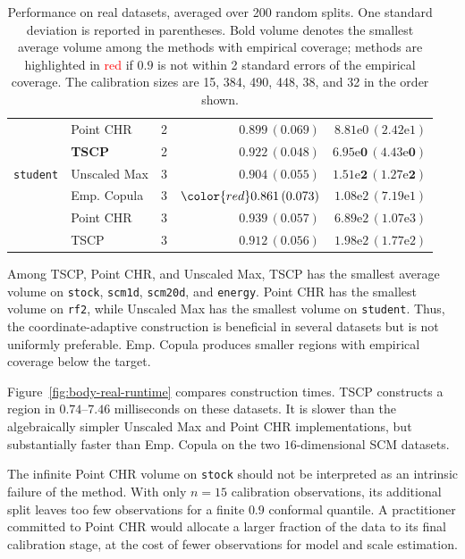 \begin{table}[!htbp]
\begin{tabular}{llrrr}
 & Point CHR & 2 & $0.899\,(0.069)$ & $8.81\mathrm{e}{0}\,(2.42\mathrm{e}{1})$ \\
 & \textbf{TSCP} & 2 & $0.922\,(0.048)$ & $\mathbf{6.95\mathrm{e}{0}\,(4.43\mathrm{e}{0})}$ \\
\addlinespace
\texttt{student} & Unscaled Max & 3 & $0.904\,(0.055)$ & $\mathbf{1.51\mathrm{e}{2}\,(1.27\mathrm{e}{2})}$ \\
 & Emp. Copula & 3 & ${\color{red}0.861\,(0.073)}$ & $1.08\mathrm{e}{2}\,(7.19\mathrm{e}{1})$ \\
 & Point CHR & 3 & $0.939\,(0.057)$ & $6.89\mathrm{e}{2}\,(1.07\mathrm{e}{3})$ \\
 & TSCP & 3 & $0.912\,(0.056)$ & $1.98\mathrm{e}{2}\,(1.77\mathrm{e}{2})$ \\
\bottomrule
\end{tabular}
\caption{Performance on real datasets, averaged over 200 random splits. One
standard deviation is reported in parentheses. Bold volume denotes the
smallest average volume among the methods with empirical coverage; methods are highlighted in \textcolor{red}{red} if $0.9$ is not within 2 standard errors of the empirical coverage. The calibration sizes are 15, 384,
490, 448, 38, and 32 in the order shown.}
\label{tab:real-data}
\end{table}

Among TSCP, Point CHR, and Unscaled Max, TSCP has the smallest average
volume on \texttt{stock}, \texttt{scm1d}, \texttt{scm20d}, and
\texttt{energy}. Point CHR has the smallest volume on \texttt{rf2}, while
Unscaled Max has the smallest volume on \texttt{student}. Thus, the
coordinate-adaptive construction is beneficial in several datasets but is
not uniformly preferable. Emp. Copula produces smaller regions with
empirical coverage below the target.

Figure~\ref{fig:body-real-runtime} compares construction times.
TSCP constructs a region in $0.74$--$7.46$ milliseconds on
these datasets. It is slower than the algebraically simpler Unscaled Max and
Point CHR implementations, but substantially faster than Emp. Copula on the
two $16$-dimensional SCM datasets. 

The infinite Point CHR volume on \texttt{stock} should not be interpreted as
an intrinsic failure of the method. With only $n=15$ calibration observations,
its additional split leaves too few observations for a finite $0.9$ conformal
quantile. A practitioner committed to Point CHR would allocate a larger
fraction of the data to its final calibration stage, at the cost of fewer
observations for model and scale estimation.

